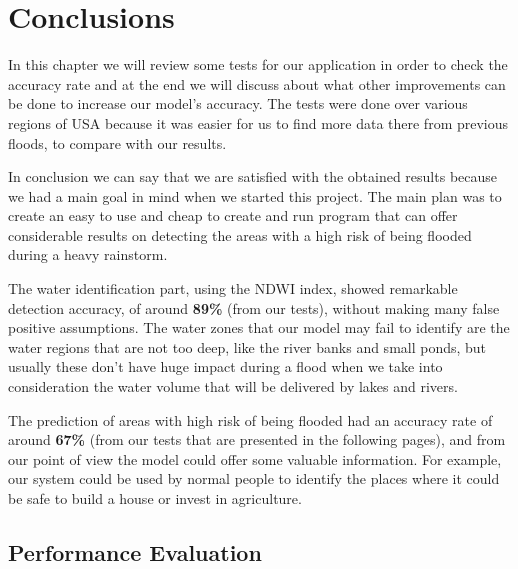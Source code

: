 \documentclass[12pt, a4paper]{report}
\begin{document}
\newpage



\newpage{}

\chapter{Conclusions}

\quad 

In this chapter we will review some tests for our application in order to check the accuracy rate and at the end we will discuss about what other improvements can be done to increase our model's accuracy. The tests were done over various regions of USA because it was easier for us to find more data there from previous floods, to compare with our results.
\par 

In conclusion we can say that we are satisfied with the obtained results because we had a main goal in mind when we started this project. The main plan was to create an easy to use and cheap to create and run program that can offer considerable results on detecting the areas with a high risk of being flooded during a heavy rainstorm.
\par 

The water identification part, using the NDWI index, showed remarkable detection accuracy, of around \textbf{89\%} (from our tests), without making many false positive assumptions. The water zones that our model may fail to identify are the water regions that are not too deep, like the river banks and small ponds, but usually these don't have huge impact during a flood when we take into consideration the water volume that will be delivered by lakes and rivers.
\par 

The prediction of areas with high risk of being flooded had an accuracy rate of around \textbf{67\%} (from our tests that are presented in the following pages), and from our point of view the model could offer some valuable information. For example, our system could be used by normal people to identify the places where it could be safe to build a house or invest in agriculture.

\newpage

\section{Performance Evaluation} 
\end{document}
